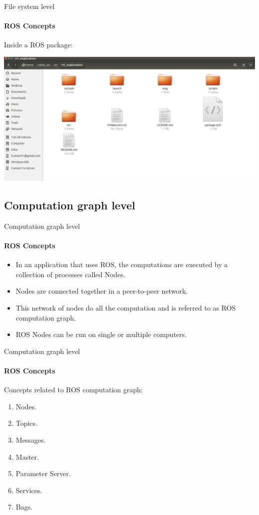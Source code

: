 \documentclass{beamer}
\begin{document}
\begin{frame}{File system level}
    \framesubtitle{ROS Concepts}
Inside a ROS package:

\vspace{0.5cm}
\centering
\includegraphics[width=.9\linewidth]{figures/example_package.png}
\end{frame}

    
\subsection{Computation graph level}

\begin{frame}{Computation graph level}
    \framesubtitle{ROS Concepts}
    \begin{itemize}
        \item In an application that uses ROS, the computations are executed by a collection of processes called Nodes.
        \item Nodes are connected together in a peer-to-peer network.
        \item This network of nodes do all the computation and is referred to as ROS computation graph.
        \item ROS Nodes can be run on single or multiple computers.
    \end{itemize}
\end{frame}

\begin{frame}{Computation graph level}
    \framesubtitle{ROS Concepts}
    
    Concepts related to ROS computation graph:
    
    \begin{enumerate}
        \item Nodes.
        \item Topics.
        \item Messages.
        \item Master.
        \item Parameter Server.
        \item Services.
        \item Bags.
    \end{enumerate}
\end{frame}
\end{document}
